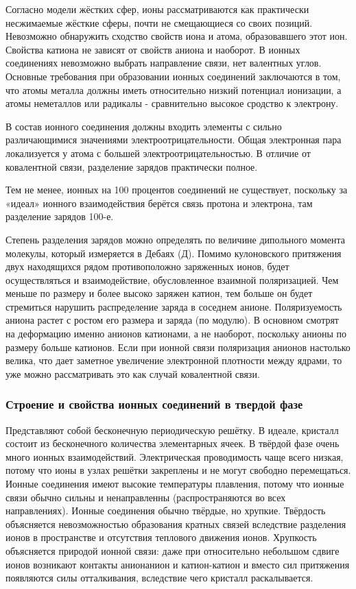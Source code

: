 \documentclass[14pt,a4paper]{scrartcl}
\begin{document}
Согласно модели жёстких сфер, ионы рассматриваются как практически
несжимаемые жёсткие сферы, почти не смещающиеся со своих
позиций. Невозможно обнаружить сходство свойств иона и атома,
образовавшего этот ион. Свойства катиона не зависят от свойств
аниона и наоборот. В ионных соединениях невозможно выбрать
направление связи, нет валентных углов. Основные требования при
образовании ионных соединений заключаются в том, что атомы
металла должны иметь относительно низкий потенциал
ионизации, а атомы неметаллов или радикалы - сравнительно
высокое сродство к электрону. 

В состав ионного соединения должны входить элементы с сильно различающимися
значениями электроотрицательности. Общая электронная пара
локализуется у атома с большей электроотрицательностью. В
отличие от ковалентной связи, разделение зарядов практически
полное. 

Тем не менее, ионных на 100 процентов соединений не существует,
поскольку за «идеал» ионного взаимодействия берётся связь
протона и электрона, там разделение зарядов 100-е. 

Степень разделения зарядов можно определять по величине
дипольного момента молекулы, который измеряется в Дебаях (Д).
Помимо кулоновского притяжения двух находящихся рядом
противоположно заряженных ионов, будет осуществляться и
взаимодействие, обусловленное взаимной поляризацией. Чем
меньше по размеру и более высоко заряжен катион, тем больше он
будет стремиться нарушить распределение заряда в соседнем
анионе. Поляризуемость аниона растет с ростом его размера и
заряда (по модулю). В основном смотрят на деформацию именно
анионов катионами, а не наоборот, поскольку анионы по размеру
больше катионов. Если при ионной связи поляризация анионов
настолько велика, что дает заметное увеличение электронной
плотности между ядрами, то уже можно рассматривать это как
случай ковалентной связи.

\subsubsection{\textbf{Строение и свойства ионных соединений в твердой фазе}}

Представляют собой бесконечную периодическую решётку. В
идеале, кристалл состоит из бесконечного количества
элементарных ячеек. В твёрдой фазе очень много ионных
взаимодействий. Электрическая проводимость чаще всего низкая,
потому что ионы в узлах решётки закреплены и не могут свободно
перемещаться. Ионные соединения имеют высокие температуры
плавления, потому что ионные связи обычно сильны и
ненаправленны (распространяются во всех направлениях). Ионные
соединения обычно твёрдые, но хрупкие. Твёрдость объясняется
невозможностью образования кратных связей вследствие
разделения ионов в пространстве и отсутствия теплового движения
ионов. Хрупкость объясняется природой ионной связи: даже при
относительно небольшом сдвиге ионов возникают контакты анионанион и катион-катион и вместо сил притяжения появляются силы
отталкивания, вследствие чего кристалл раскалывается.
\end{document}
